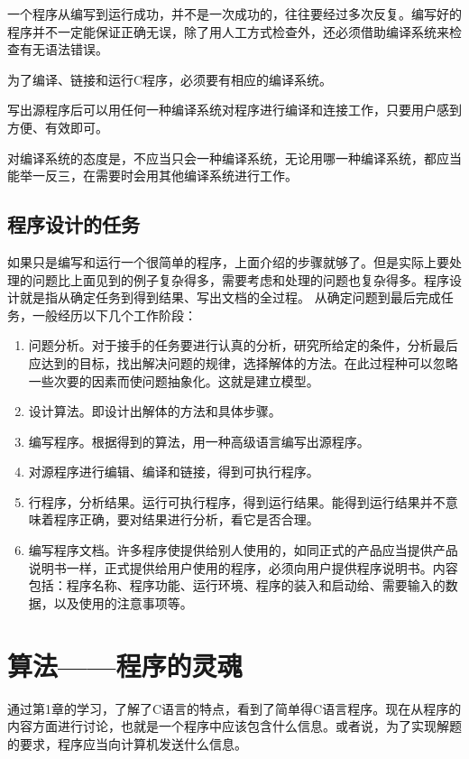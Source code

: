  一个程序从编写到运行成功，并不是一次成功的，往往要经过多次反复。编写好的程序并不一定能保证正确无误，除了用人工方式检查外，还必须借助编译系统来检查有无语法错误。

 为了编译、链接和运行C程序，必须要有相应的编译系统。

 写出源程序后可以用任何一种编译系统对程序进行编译和连接工作，只要用户感到方便、有效即可。

 对编译系统的态度是，不应当只会一种编译系统，无论用哪一种编译系统，都应当能举一反三，在需要时会用其他编译系统进行工作。

\section{程序设计的任务}

如果只是编写和运行一个很简单的程序，上面介绍的步骤就够了。但是实际上要处理的问题比上面见到的例子复杂得多，需要考虑和处理的问题也复杂得多。程序设计就是指从确定任务到得到结果、写出文档的全过程。
从确定问题到最后完成任务，一般经历以下几个工作阶段：
\begin{enumerate}
	\item 问题分析。对于接手的任务要进行认真的分析，研究所给定的条件，分析最后应达到的目标，找出解决问题的规律，选择解体的方法。在此过程种可以忽略一些次要的因素而使问题抽象化。这就是建立模型。
	\item 设计算法。即设计出解体的方法和具体步骤。
	\item 编写程序。根据得到的算法，用一种高级语言编写出源程序。
	\item 对源程序进行编辑、编译和链接，得到可执行程序。
	\item 行程序，分析结果。运行可执行程序，得到运行结果。能得到运行结果并不意味着程序正确，要对结果进行分析，看它是否合理。
	\item 编写程序文档。许多程序使提供给别人使用的，如同正式的产品应当提供产品说明书一样，正式提供给用户使用的程序，必须向用户提供程序说明书。内容包括：程序名称、程序功能、运行环境、程序的装入和启动给、需要输入的数据，以及使用的注意事项等。
\end{enumerate}

\chapter{算法——程序的灵魂}

通过第1章的学习，了解了C语言的特点，看到了简单得C语言程序。现在从程序的内容方面进行讨论，也就是一个程序中应该包含什么信息。或者说，为了实现解题的要求，程序应当向计算机发送什么信息。


